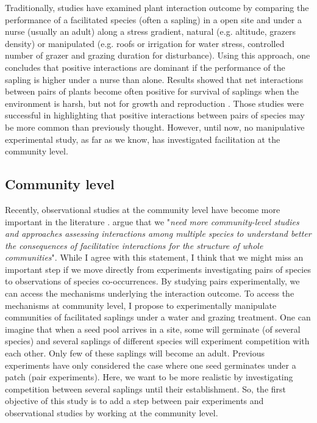 \documentclass[12pt]{article} %
\begin{document}
Traditionally, studies have examined plant interaction outcome by comparing the performance of a facilitated species (often a sapling) in a open site and under a nurse (usually an adult) along a stress gradient, natural (e.g. altitude, grazers density) or manipulated (e.g. roofs or irrigation for water stress, controlled number of grazer and grazing duration for disturbance).
Using this approach, one concludes that positive interactions are dominant if the performance of the sapling is higher under a nurse than alone. Results showed that net interactions between pairs of plants become often positive for survival of saplings when the environment is harsh, but not for growth and reproduction \citep{He2013}.
Those studies were successful in highlighting that positive interactions between pairs of species may be more common than previously thought. However, until now, no manipulative experimental study, as far as we know, has investigated facilitation at the community level. 

\subsection{Community level}
Recently, observational studies at the community level have become more important in the literature \citep{Soliveres2012, Gross2013, Soliveres2014b}. %
\citet{Soliveres2014} argue that we "\textit{need more community-level studies and approaches assessing interactions among multiple species to understand better the consequences of facilitative interactions for the structure of whole communities}". 
While I agree with this statement, I think that we might miss an important step if we move directly from experiments investigating pairs of species to observations of species co-occurrences. By studying pairs experimentally, we can access the mechanisms underlying the interaction outcome. 
To access the mechanisms at community level, I propose to experimentally manipulate communities of facilitated saplings under a water and grazing treatment.
One can imagine that when a seed pool arrives in a site, some will germinate (of several species) and several saplings of different species will experiment competition with each other. Only few of these saplings will become an adult. Previous experiments have only considered the case where one seed germinates under a patch (pair experiments). Here, we want to be more realistic by investigating competition between several saplings until their establishment. So, the first objective of this study is to add a step between pair experiments and observational studies by working at the community level.
\end{document}
